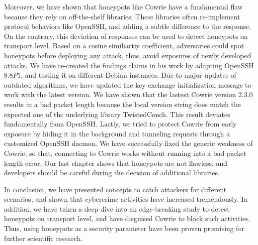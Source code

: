 Moreover, we have shown that honeypots like Cowrie have a fundamental flaw because they rely on off-the-shelf libraries.
These libraries often re-implement protocol behaviors like OpenSSH, and adding a subtle difference to the response.
On the contrary, this deviation of responses can be used to detect honeypots on transport level.
Based on a cosine similiartiy coefficient, adversaries could spot honeypots before deploying any attack, thus, avoid exposures of newly developed attacks.
We have re-created the findings \citet{vetterl2020} claims in his work by adapting OpenSSH $8.8P1$, and testing it on different Debian instances.
Due to major updates of outdated algorithms, we have updated the key exchange initialization message to work with the latest version.
We have shown that the lastest Cowrie version $2.3.0$ results in a bad packet length because the local version string does match the expected one of the underlying library TwistedConch.
This result deviates fundamentally from OpenSSH.
Lastly, we tried to protect Cowrie from early exposure by hiding it in the background and tunneling requests through a customized OpenSSH daemon.
We have successfully fixed the generic weakness of Cowrie, so that, connecting to Cowrie works without running into a bad packet length error.
Our last chapter shows that honeypots are not flawless, and developers should be careful during the decision of additional libraries.

In conclusion, we have presented concepts to catch attackers for different scenarios, and shown that cybercrime activities have increased tremendously.
In addition, we have taken a deep dive into an edge-breaking study to detect honeypots on transport level, and have disguised Cowrie to block such activities.
Thus, using honeypots as a security parameter have been proven promising for further scientific research.
